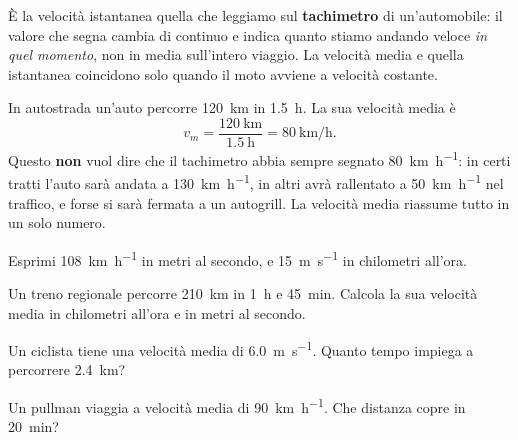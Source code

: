 È la velocità istantanea quella che leggiamo sul \textbf{tachimetro} di un'automobile: il valore che segna cambia di continuo e indica quanto stiamo andando veloce \emph{in quel momento}, non in media sull'intero viaggio. La velocità media e quella istantanea coincidono solo quando il moto avviene a velocità costante.

\begin{testexample}
In autostrada un'auto percorre \SI{120}{\kilo\metre} in \SI{1,5}{\hour}. La sua velocità media è
\[ v_m = \frac{\SI{120}{\kilo\metre}}{\SI{1,5}{\hour}} = \SI{80}{\kilo\metre\per\hour}. \]
Questo \textbf{non} vuol dire che il tachimetro abbia sempre segnato \SI{80}{\kilo\metre\per\hour}: in certi tratti l'auto sarà andata a \SI{130}{\kilo\metre\per\hour}, in altri avrà rallentato a \SI{50}{\kilo\metre\per\hour} nel traffico, e forse si sarà fermata a un autogrill. La velocità media riassume tutto in un solo numero.
\end{testexample}

\begin{esercizio}
Esprimi \SI{108}{\kilo\metre\per\hour} in metri al secondo, e \SI{15}{\metre\per\second} in chilometri all'ora.\\
\end{esercizio}

\begin{esercizio}
Un treno regionale percorre \SI{210}{\kilo\metre} in \SI{1}{\hour} e \SI{45}{\minute}. Calcola la sua velocità media in chilometri all'ora e in metri al secondo.\\
\end{esercizio}

\begin{esercizio}
Un ciclista tiene una velocità media di \SI{6,0}{\metre\per\second}. Quanto tempo impiega a percorrere \SI{2,4}{\kilo\metre}?\\
\end{esercizio}

\begin{esercizio}
Un pullman viaggia a velocità media di \SI{90}{\kilo\metre\per\hour}. Che distanza copre in \SI{20}{\minute}?\\
\end{esercizio}

